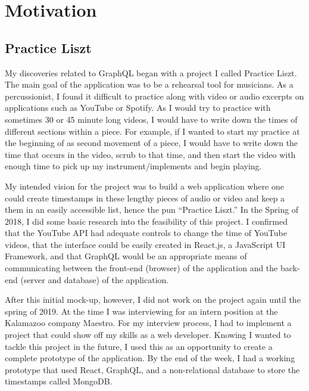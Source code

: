 \section{Motivation}

\subsection{Practice Liszt}
My discoveries related to GraphQL began with a project I called Practice Liszt.  The main goal of the application was to be a rehearsal tool for musicians. As a percussionist, I found it difficult to practice along with video or audio excerpts on applications such as YouTube or Spotify.  As I would try to practice with sometimes 30 or 45 minute long videos, I would have to write down the times of different sections within a piece.  For example, if I wanted to start my practice at the beginning of as second movement of a piece, I would have to write down the time that occurs in the video, scrub to that time, and then start the video with enough time to pick up my instrument/implements and begin playing.

My intended vision for the project was to build a web application where one could create timestamps in these lengthy pieces of audio or video and keep a them in an easily accessible list, hence the pun ``Practice Liszt.'' In the Spring of 2018, I did some basic research into the feasibility of this project.  I confirmed that the YouTube API had adequate controls to change the time of YouTube videos, that the interface could be easily created in React.js, a JavaScript UI Framework, and that GraphQL would be an appropriate means of communicating between the front-end (browser) of the application and the back-end (server and database) of the application.

After this initial mock-up, however, I did not work on the project again until the spring of 2019.  At the time I was interviewing for an intern position at the Kalamazoo company Maestro.  For my interview process, I had to implement a project that could show off my skills as a web developer.  Knowing I wanted to tackle this project in the future, I used this as an opportunity to create a complete prototype of the application.  By the end of the week, I had a working prototype that used React, GraphQL, and a non-relational database to store the timestamps called MongoDB.

